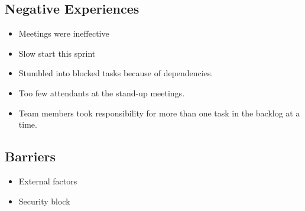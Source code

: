 \subsection{Negative Experiences}
\begin{itemize}
\item Meetings were ineffective
\item Slow start this sprint
\item Stumbled into blocked tasks because of dependencies.
\item Too few attendants at the stand-up meetings.
\item Team members took responsibility for more than one task in the backlog at a time. 
\end{itemize}

\subsection{Barriers}
\begin{itemize}
\item External factors
\item Security block
\end{itemize}

